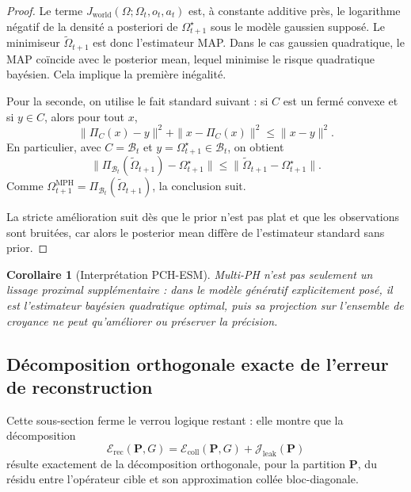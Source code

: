 \documentclass[11pt,a4paper]{article}
\newtheorem{corollary}{Corollaire}[section]
\newcommand{\1}{\mathbf 1}
\begin{document}
\begin{proof}
Le terme \(J_{\mathrm{world}}(\Omega;\Omega_t,o_t,a_t)\) est, à constante additive près, le logarithme négatif de la densité a posteriori de \(\Omega_{t+1}^\star\) sous le modèle gaussien supposé.
Le minimiseur \(\tilde\Omega_{t+1}\) est donc l'estimateur MAP.  
Dans le cas gaussien quadratique, le MAP coïncide avec le posterior mean, lequel minimise le risque quadratique bayésien.
Cela implique la première inégalité.

Pour la seconde, on utilise le fait standard suivant :
si \(C\) est un fermé convexe et si \(y\in C\), alors pour tout \(x\),
\[
\|\Pi_C(x)-y\|^2+\|x-\Pi_C(x)\|^2\le \|x-y\|^2.
\]
En particulier, avec \(C=\mathcal B_t\) et \(y=\Omega_{t+1}^\star\in\mathcal B_t\), on obtient
\[
\|\Pi_{\mathcal B_t}(\tilde\Omega_{t+1})-\Omega_{t+1}^\star\|
\le
\|\tilde\Omega_{t+1}-\Omega_{t+1}^\star\|.
\]
Comme \(\Omega_{t+1}^{\mathrm{MPH}}=\Pi_{\mathcal B_t}(\tilde\Omega_{t+1})\), la conclusion suit.

La stricte amélioration suit dès que le prior n'est pas plat et que les observations sont bruitées, car alors le posterior mean diffère de l'estimateur standard sans prior.
\end{proof}

\begin{corollary}[Interprétation PCH-ESM]
Multi-PH n'est pas seulement un lissage proximal supplémentaire :
dans le modèle génératif explicitement posé, il est l'estimateur bayésien quadratique optimal, puis sa projection sur l'ensemble de croyance ne peut qu'améliorer ou préserver la précision.
\end{corollary}




\subsection{Décomposition orthogonale exacte de l'erreur de reconstruction}

Cette sous-section ferme le verrou logique restant : elle montre que la décomposition
\[
\mathcal E_{\mathrm{rec}}(\mathbf P,G)
=
\mathcal E_{\mathrm{coll}}(\mathbf P,G)
+
\mathcal J_{\mathrm{leak}}(\mathbf P)
\]
résulte exactement de la décomposition orthogonale, pour la partition \(\mathbf P\), du résidu
entre l'opérateur cible et son approximation collée bloc-diagonale.
\end{document}
